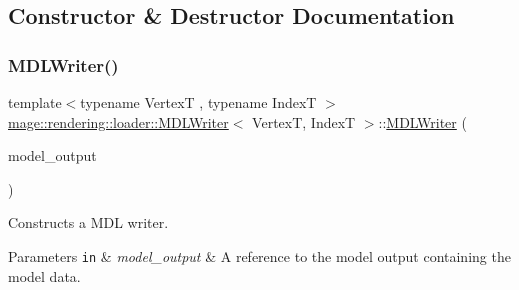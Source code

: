 \subsection{Constructor \& Destructor Documentation}
\mbox{\label{classmage_1_1rendering_1_1loader_1_1_m_d_l_writer_a6b30e49f08b5c6cd4702f5fdecd17561}} 
\subsubsection{\texorpdfstring{M\+D\+L\+Writer()}{MDLWriter()}\hspace{0.1cm}{\footnotesize\ttfamily [1/3]}}
{\footnotesize\ttfamily template$<$typename VertexT , typename IndexT $>$ \\
\mbox{\hyperlink{classmage_1_1rendering_1_1loader_1_1_m_d_l_writer}{mage\+::rendering\+::loader\+::\+M\+D\+L\+Writer}}$<$ VertexT, IndexT $>$\+::\mbox{\hyperlink{classmage_1_1rendering_1_1loader_1_1_m_d_l_writer}{M\+D\+L\+Writer}} (\begin{DoxyParamCaption}\item[{const \mbox{\hyperlink{structmage_1_1rendering_1_1_model_output}{Model\+Output}}$<$ VertexT, IndexT $>$ \&}]{model\+\_\+output }\end{DoxyParamCaption})\hspace{0.3cm}{\ttfamily [explicit]}}

Constructs a M\+DL writer.


\begin{DoxyParams}[1]{Parameters}
\mbox{\tt in}  & {\em model\+\_\+output} & A reference to the model output containing the model data. \\
\hline
\end{DoxyParams}
\mbox{\label{classmage_1_1rendering_1_1loader_1_1_m_d_l_writer_a475ff3efdba707303052bae28d3ba85b}} 
